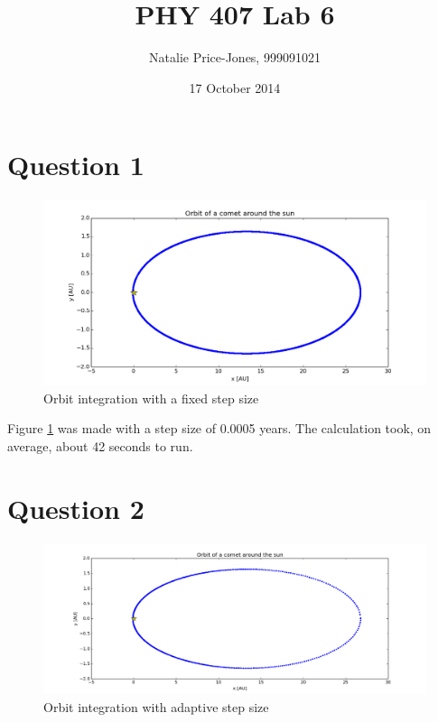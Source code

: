 \documentclass[a4paper,12pt]{article}
\begin{document}
\onehalfspacing
\title{PHY 407 Lab 6}
\author{Natalie Price-Jones, 999091021}
\date{17 October 2014}
\maketitle

\section{Question 1}

\begin{figure}[H]
\centering
\includegraphics[width = \linewidth]{lab6q1.png}
\caption{Orbit integration with a fixed step size}
\label{fig:q1}
\end{figure}
 
Figure \ref{fig:q1} was made with a step size of 0.0005 years. The calculation took, on average, about 42 seconds to run.

\section{Question 2}

\begin{figure}[H]
\centering
\includegraphics[width = \linewidth]{lab6q2.png}
\caption{Orbit integration with adaptive step size}
\label{fig:q2}
\end{figure}
\end{document}
